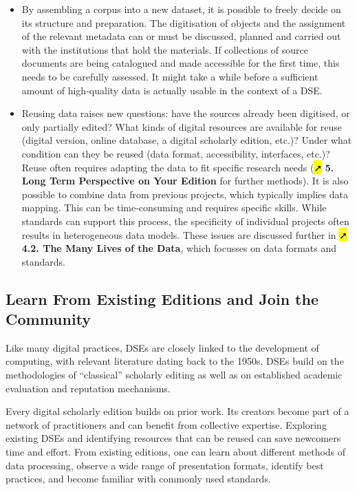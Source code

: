 \documentclass[
  letterpaper,
  DIV=11,
  numbers=noendperiod]{scrreprt}
\begin{document}
\begin{itemize}
\item
  By assembling a corpus into a new dataset, it is possible to freely
  decide on its structure and preparation. The digitisation of objects
  and the assignment of the relevant metadata can or must be discussed,
  planned and carried out with the institutions that hold the materials.
  If collections of source documents are being catalogued and made
  accessible for the first time, this needs to be carefully assessed. It
  might take a while before a sufficient amount of high-quality data is
  actually usable in the context of a DSE.
\item
  Reusing data raises new questions: have the sources already been
  digitised, or only partially edited? What kinds of digital resources
  are available for reuse (digital version, online database, a digital
  scholarly edition, etc.)? Under what condition can they be reused
  (data format, accessibility, interfaces, etc.)? Reuse often requires
  adapting the data to fit specific research needs (\hl{➚} \textbf{5.
  Long Term Perspective on Your Edition} for further methods). It is
  also possible to combine data from previous projects, which typically
  implies data mapping. This can be time-consuming and requires specific
  skills. While standards can support this process, the specificity of
  individual projects often results in heterogeneous data models. These
  issues are discussed further in \hl{➚} \textbf{4.2. The Many Lives of
  the Data}, which focusses on data formats and standards.
\end{itemize}

\subsection{Learn From Existing Editions and Join the
Community}\label{learn-from-existing-editions-and-join-the-community}

Like many digital practices, DSEs are closely linked to the development
of computing, with relevant literature dating back to the 1950s. DSEs
build on the methodologies of ``classical'' scholarly editing as well as
on established academic evaluation and reputation mechanisms.

Every digital scholarly edition builds on prior work. Its creators
become part of a network of practitioners and can benefit from
collective expertise. Exploring existing DSEs and identifying resources
that can be reused can save newcomers time and effort. From existing
editions, one can learn about different methods of data processing,
observe a wide range of presentation formats, identify best practices,
and become familiar with commonly used standards.
\end{document}
